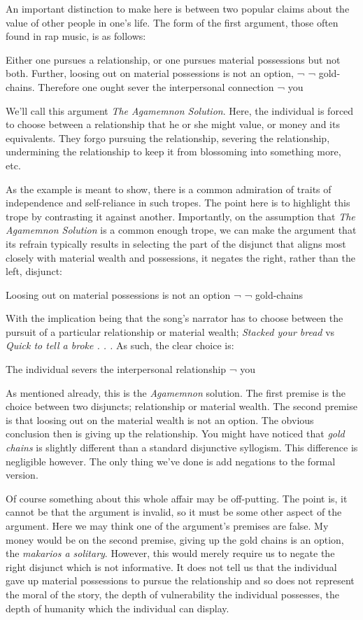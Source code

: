 \documentclass[
  letterpaper,
  DIV=11,
  numbers=noendperiod]{scrartcl}
\theoremstyle{remark}
\begin{document}
An important distinction to make here is between two popular claims
about the value of other people in one's life. The form of the first
argument, those often found in rap music, is as follows:

Either one pursues a relationship, or one pursues material possessions
but not both. Further, loosing out on material possessions is not an
option, ¬ ¬ gold-chains. Therefore one ought sever the interpersonal
connection ¬ you

We'll call this argument \emph{The Agamemnon Solution}. Here, the
individual is forced to choose between a relationship that he or she
might value, or money and its equivalents. They forgo pursuing the
relationship, severing the relationship, undermining the relationship to
keep it from blossoming into something more, etc.

As the example is meant to show, there is a common admiration of traits
of independence and self-reliance in such tropes. The point here is to
highlight this trope by contrasting it against another. Importantly, on
the assumption that \emph{The Agamemnon Solution} is a common enough
trope, we can make the argument that its refrain typically results in
selecting the part of the disjunct that aligns most closely with
material wealth and possessions, it negates the right, rather than the
left, disjunct:

Loosing out on material possessions is not an option ¬ ¬ gold-chains

With the implication being that the song's narrator has to choose
between the pursuit of a particular relationship or material wealth;
\emph{Stacked your bread} vs \emph{Quick to tell a broke . . .} As such,
the clear choice is:

The individual severs the interpersonal relationship ¬ you

As mentioned already, this is the \emph{Agamemnon} solution. The first
premise is the choice between two disjuncts; relationship or material
wealth. The second premise is that loosing out on the material wealth is
not an option. The obvious conclusion then is giving up the
relationship. You might have noticed that \emph{gold chains} is slightly
different than a standard disjunctive syllogism. This difference is
negligible however. The only thing we've done is add negations to the
formal version.

Of course something about this whole affair may be off-putting. The
point is, it cannot be that the argument is invalid, so it must be some
other aspect of the argument. Here we may think one of the argument's
premises are false. My money would be on the second premise, giving up
the gold chains is an option, the \emph{makarios a solitary}. However,
this would merely require us to negate the right disjunct which is not
informative. It does not tell us that the individual gave up material
possessions to pursue the relationship and so does not represent the
moral of the story, the depth of vulnerability the individual possesses,
the depth of humanity which the individual can display.
\end{document}
